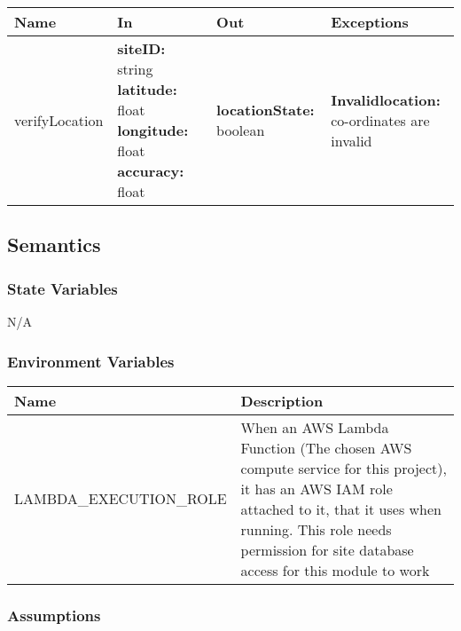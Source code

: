 \documentclass[12pt, titlepage]{article}
\begin{document}
{  \begin{center}
    \begin{tabular}{>{\raggedright}p{2.75cm} >{\raggedright}p{3.25cm}
      >{\raggedright}p{4.5cm} p{5cm}}
      \hline
      \textbf{Name} & \textbf{In} & \textbf{Out} & \textbf{Exceptions} \\
      \hline
      verifyLocation & \textbf{siteID:} string \newline
      \textbf{latitude:} float \newline
      \textbf{longitude:} float \newline \textbf{accuracy:} float &
      \textbf{locationState:} boolean &
      \textbf{Invalidlocation:} co-ordinates are invalid \\
      \hline
    \end{tabular}
  \end{center}

  \subsection{Semantics}

  \subsubsection{State Variables}

  N/A

  \subsubsection{Environment Variables}

  \begin{center}
    \begin{tabular}{p{6cm} p{10cm}}
      \hline
      \textbf{Name} & \textbf{Description} \\
      \hline
      LAMBDA\_EXECUTION\_ROLE & When an AWS Lambda Function (The chosen
      AWS compute service for this project), it has an AWS IAM role
      attached to it, that it uses when running. This role needs
      permission for site database access for this module to work \\
      \hline
    \end{tabular}
  \end{center}

  \subsubsection{Assumptions}

}
\end{document}
